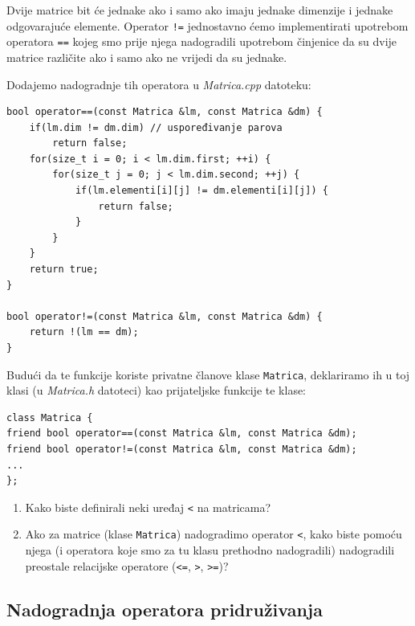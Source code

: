 \begin{rjesenje}
    Dvije matrice bit će jednake ako i samo ako imaju jednake
    dimenzije i jednake odgovarajuće elemente.
    Operator \texttt{!=} jednostavno ćemo implementirati upotrebom operatora \texttt{==}
    kojeg smo prije njega nadogradili
    upotrebom činjenice da su dvije matrice različite
    ako i samo ako ne vrijedi da su jednake.
    \medskip

    Dodajemo nadogradnje tih operatora u \textit{Matrica.cpp} datoteku:
    \begin{verbatim}
bool operator==(const Matrica &lm, const Matrica &dm) {
    if(lm.dim != dm.dim) // uspoređivanje parova
        return false;
    for(size_t i = 0; i < lm.dim.first; ++i) {
        for(size_t j = 0; j < lm.dim.second; ++j) {
            if(lm.elementi[i][j] != dm.elementi[i][j]) {
                return false;
            }
        }
    }
    return true;
}

bool operator!=(const Matrica &lm, const Matrica &dm) {
    return !(lm == dm);
}
    \end{verbatim}

Budući da te funkcije koriste privatne članove klase \texttt{Matrica},
deklariramo ih u toj klasi (u \textit{Matrica.h} datoteci) kao prijateljske funkcije te klase:
\begin{verbatim}
class Matrica {
friend bool operator==(const Matrica &lm, const Matrica &dm);
friend bool operator!=(const Matrica &lm, const Matrica &dm);
...
};
\end{verbatim}
\end{rjesenje}


\begin{razmisljanje}
    \begin{enumerate}
        \item
        Kako biste definirali neki uređaj \texttt{<} na matricama?
        \item 
        Ako za matrice (klase \texttt{Matrica})
        nadogradimo operator \texttt{<},
        kako biste pomoću njega (i operatora koje smo za tu klasu prethodno nadogradili)
        nadogradili preostale relacijske operatore
        (\texttt{<=}, \texttt{>}, \texttt{>=})?
    \end{enumerate}
\end{razmisljanje}


\subsection{Nadogradnja operatora pridruživanja}

